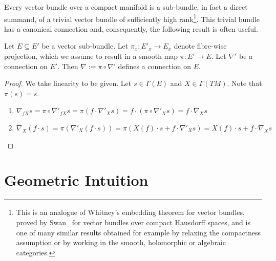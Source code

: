 Every vector bundle over a compact manifold is a sub-bundle, in fact a direct summand, of a trivial vector bundle of sufficiently high rank\footnote{This is an analogue of Whitney's embedding theorem for vector bundles, proved by Swan~\cite[Lemma 5 and Corollary 5]{article:swan} for vector bundles over compact Hausdorff spaces, and is one of many similar results obtained for example by relaxing the compactness assumption or by working in the smooth, holomorphic or algebraic categories.}.
This trivial bundle has a canonical connection and, consequently, the following result is often useful.
\begin{proposition}\label{projection}
  Let $E\subseteq E'$ be a vector sub-bundle. Let $\pi_x:E'_x\to E_x$ denote fibre-wise projection, which we assume to result in a smooth map $\pi:E'\to E$. Let $\nabla'$ be a connection on $E'$. Then $\nabla:=\pi\circ\nabla'$ defines a connection on $E$.
\end{proposition}
\begin{proof}
  We take linearity to be given. Let $s\in\Gamma(E)$ and $X\in\Gamma(TM)$. Note that $\pi(s)=s$.
  \begin{enumerate}
    \item $\nabla_{fX}s=\pi\circ\nabla'_{fX}s=\pi(f\cdot\nabla'_Xs)=f\cdot(\pi\circ\nabla'_Xs)=f\cdot\nabla_Xs$
    \item $\nabla_X(f\cdot s)=\pi(\nabla'_X(f\cdot s))=\pi(X(f)\cdot s+f\cdot\nabla'_Xs)=X(f)\cdot s+f\cdot\nabla_Xs$
  \end{enumerate}
\end{proof}

\section{Geometric Intuition}

